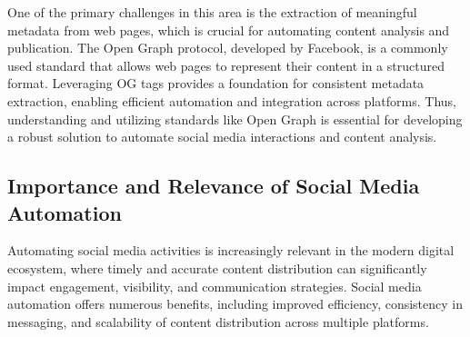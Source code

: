 One of the primary challenges in this area is the extraction of meaningful metadata from web pages, which is crucial for automating content analysis and publication. The Open Graph protocol, developed by Facebook, is a commonly used standard that allows web pages to represent their content in a structured format. Leveraging OG tags provides a foundation for consistent metadata extraction, enabling efficient automation and integration across platforms. Thus, understanding and utilizing standards like Open Graph is essential for developing a robust solution to automate social media interactions and content analysis.

\subsection{Importance and Relevance of Social Media Automation}
\label{sec:importance_and_relevance_of_social_media_automation}
Automating social media activities is increasingly relevant in the modern digital ecosystem, where timely and accurate content distribution can significantly impact engagement, visibility, and communication strategies. Social media automation offers numerous benefits, including improved efficiency, consistency in messaging, and scalability of content distribution across multiple platforms.


